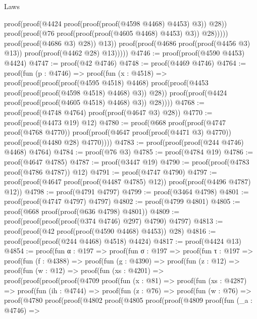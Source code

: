 \begin{lexlean}{Laws}
\begin{coremodule}
                              proof(proof(@4424 proof(proof(proof(@4598 @4468) @4453) @3)) @28))
                            proof(proof(@76 proof(proof(proof(@4605 @4468) @4453) @3)) @28)))))
                  proof(proof(@4686 @3) @28))
                @13))
          proof(proof(@4686 proof(proof(@4456 @3) @13)) proof(proof(@4462 @28) @13)))))
@4746 := proof(proof(@4590 @4453) @4424)
@4747 := proof(@42 @4746)
@4748 := proof(@4469 @4746)
@4764 := proof(fun (p : @4746) =>
    proof(fun (x : @4518) =>
      proof(proof(proof(proof(@4595 @4518) @4468)
            proof(proof(@4453 proof(proof(proof(@4598 @4518) @4468) @3)) @28))
          proof(proof(@4424 proof(proof(proof(@4605 @4518) @4468) @3)) @28))))
@4768 := proof(proof(@4748 @4764) proof(proof(@4647 @3) @28))
@4770 := proof(proof(@4473 @19) @12)
@4780 := proof(@668
      proof(proof(@4747 proof(@4768 @4770))
          proof(proof(@4647 proof(proof(@4471 @3) @4770)) proof(proof(@4480 @28) @4770))))
@4783 := proof(proof(proof(@244 @4746) @4468) @4764)
@4784 := proof(@76 @3)
@4785 := proof(@4784 @19)
@4786 := proof(@4647 @4785)
@4787 := proof(@3447 @19)
@4790 := proof(proof(@4783 proof(@4786 @4787)) @12)
@4791 := proof(@4747 @4790)
@4797 := proof(proof(@4647 proof(proof(@4487 @4785) @12)) proof(proof(@4496 @4787) @12))
@4798 := proof(@4791 @4797)
@4799 := proof(@3464 @4798)
@4801 := proof(proof(@4747 @4797) @4797)
@4802 := proof(@4799 @4801)
@4805 := proof(@668 proof(proof(@636 @4798) @4801))
@4809 := proof(proof(proof(proof(@374 @4746) @297) @4790) @4797)
@4813 := proof(proof(@42 proof(proof(@4590 @4468) @4453)) @28)
@4816 := proof(proof(proof(@244 @4468) @4518) @4424)
@4817 := proof(@4424 @13)
@4854 := proof(fun {α : @197} =>
    proof(fun {σ : @197} =>
      proof(fun {τ : @197} =>
        proof(fun (f : @4388) =>
          proof(fun (g : @4390) =>
            proof(fun (z : @12) =>
              proof(fun (w : @12) =>
                proof(fun (xs : @4201) =>
                  proof(proof(proof(proof(@4709
                            proof(fun (x : @81) =>
                              proof(fun (xs : @4287) =>
                                proof(fun (ih : @4744) =>
                                  proof(fun (z : @76) =>
                                    proof(fun (w : @76) =>
                                      proof(@4780
                                          proof(proof(@4802
                                                proof(@4805
                                                    proof(proof(@4809
                                                          proof(fun (_a : @4746) =>

\end{coremodule}
\end{lexlean}
